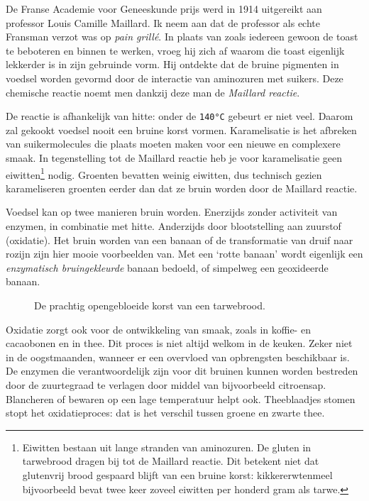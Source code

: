 \documentclass[
  11pt,
  dutch,
]{memoir}
\newcommand{\adjustimg}{%
  \checkoddpage%
  \ifoddpage\hspace*{\dimexpr\evensidemargin-\oddsidemargin}\else\hspace*{-\dimexpr\evensidemargin-\oddsidemargin}\fi%
}
\newcommand{\centerimg}[2][width=\textwidth]{%
  \makebox[\textwidth]{\adjustimg\texttt{[image: \#2]}}%
}
\begin{document}
De Franse Academie voor Geneeskunde prijs werd in 1914 uitgereikt aan
professor Louis Camille Maillard. Ik neem aan dat de professor als echte
Fransman verzot was op \emph{pain grillé}. In plaats van zoals iedereen
gewoon de toast te beboteren en binnen te werken, vroeg hij zich af
waarom die toast eigenlijk lekkerder is in zijn gebruinde vorm. Hij
ontdekte dat de bruine pigmenten in voedsel worden gevormd door de
interactie van aminozuren met suikers. Deze chemische reactie noemt men
dankzij deze man de \emph{Maillard reactie}.

De reactie is afhankelijk van hitte: onder de \texttt{140°C} gebeurt er
niet veel. Daarom zal gekookt voedsel nooit een bruine korst vormen.
Karamelisatie is het afbreken van suikermolecules die plaats moeten
maken voor een nieuwe en complexere smaak. In tegenstelling tot de
Maillard reactie heb je voor karamelisatie geen eiwitten\footnote{Eiwitten
  bestaan uit lange stranden van aminozuren. De gluten in tarwebrood
  dragen bij tot de Maillard reactie. Dit betekent niet dat glutenvrij
  brood gespaard blijft van een bruine korst: kikkererwtenmeel
  bijvoorbeeld bevat twee keer zoveel eiwitten per honderd gram als
  tarwe.} nodig. Groenten bevatten weinig eiwitten, dus technisch gezien
karameliseren groenten eerder dan dat ze bruin worden door de Maillard
reactie.

Voedsel kan op twee manieren bruin worden. Enerzijds zonder activiteit
van enzymen, in combinatie met hitte. Anderzijds door blootstelling aan
zuurstof (oxidatie). Het bruin worden van een banaan of de transformatie
van druif naar rozijn zijn hier mooie voorbeelden van. Met een `rotte
banaan' wordt eigenlijk een \emph{enzymatisch bruingekleurde} banaan
bedoeld, of simpelweg een geoxideerde banaan.

\begin{figure}
    \mbox{} \par
    \noindent\centerimg[width=\paperwidth]{img/bw/korst.jpg}
    \caption[De opengebloeide korst van een tarwebrood.]{De prachtig opengebloeide korst van een tarwebrood.}
\end{figure}

Oxidatie zorgt ook voor de ontwikkeling van smaak, zoals in koffie- en
cacaobonen en in thee. Dit proces is niet altijd welkom in de keuken.
Zeker niet in de oogstmaanden, wanneer er een overvloed van opbrengsten
beschikbaar is. De enzymen die verantwoordelijk zijn voor dit bruinen
kunnen worden bestreden door de zuurtegraad te verlagen door middel van
bijvoorbeeld citroensap. Blancheren of bewaren op een lage temperatuur
helpt ook. Theeblaadjes stomen stopt het oxidatieproces: dat is het
verschil tussen groene en zwarte thee.
\end{document}
